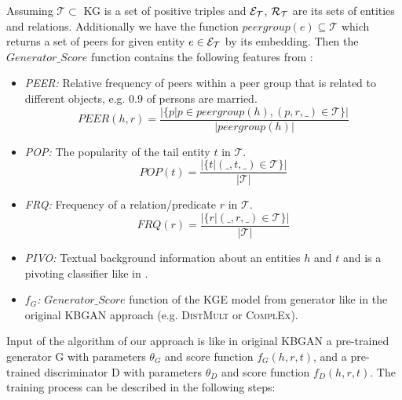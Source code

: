 Assuming $\mathcal{T} \subset $ \ac{KG} is a set of positive triples and $\mathcal{E}_{\mathcal{T}}$, $\mathcal{R}_{\mathcal{T}}$ are its sets of entities and relations.
Additionally we have the function $peergroup(e) \subseteq \mathcal{T}$ which returns a set of peers for given entity $e \in \mathcal{E}_{\mathcal{T}}$ by its embedding. 
Then the $Generator\_Score$ function contains the following features from \cite{arnaout2020enriching}:
\begin{itemize}
    \item 
    \emph{\ac{PEER}:} 
    Relative frequency of peers within a peer group that is related to different objects, e.g. 0.9 of persons are married. 
    \begin{equation}
        PEER(h,r) = \frac{|\{p | p \in peergroup(h), (p, r, \_) \in \mathcal{T}\}|}{|peergroup(h)|}
    \end{equation}

    \item
    \emph{\ac{POP}:} 
    The popularity of the tail entity $t$ in $\mathcal{T}$. 
    \begin{equation}
        POP(t) = \frac{|\{t | (\_, t, \_) \in \mathcal{T}\}|}{|\mathcal{T}|}
    \end{equation}

    \item 
    \emph{\ac{FRQ}:} 
    Frequency of a relation/predicate $r$ in $\mathcal{T}$. 
    \begin{equation}
        FRQ(r) = \frac{|\{r | (\_, r, \_) \in \mathcal{T}\}|}{|\mathcal{T}|}
    \end{equation}
    
    \item 
    \emph{\ac{PIVO}:} 
    Textual background information about an entities $h$ and $t$ and is a pivoting classifier like in \cite{arnaout2020enriching}.
    
    \item 
    \emph{$f_G$:} 
    $Generator\_Score$ function of the \ac{KGE} model from generator like in the original \ac{KBGAN} approach (e.g. \textsc{DistMult}  or \textsc{ComplEx}).
    
\end{itemize}
Input of the algorithm of our approach is like in original \ac{KBGAN} a pre-trained generator G with parameters $\theta_G$ and score function $f_G(h,r,t)$, 
and a pre-trained discriminator D with parameters $\theta_D$ and score function $f_D(h,r,t)$.
The training process can be described in the following steps:
